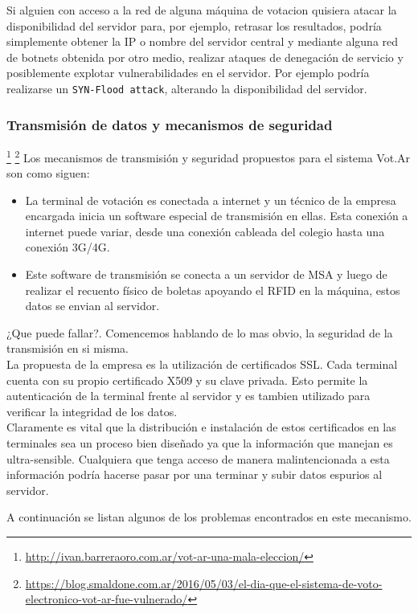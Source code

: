 Si alguien con acceso a la red de alguna máquina de votacion quisiera atacar la disponibilidad del servidor para, por ejemplo, retrasar los resultados, podría simplemente obtener la IP o nombre del servidor central y mediante alguna red de botnets obtenida por otro medio, realizar ataques de denegación de servicio y posiblemente explotar vulnerabilidades en el servidor. Por ejemplo podría realizarse un \texttt{SYN-Flood attack}, alterando la disponibilidad del servidor.


\subsubsection{Transmisión de datos y mecanismos de seguridad}
\footnote{\url{http://ivan.barreraoro.com.ar/vot-ar-una-mala-eleccion/}}
\footnote{\url{https://blog.smaldone.com.ar/2016/05/03/el-dia-que-el-sistema-de-voto-electronico-vot-ar-fue-vulnerado/}}
Los mecanismos de transmisión y seguridad propuestos para el sistema Vot.Ar son como siguen:
\begin{itemize}
	\item La terminal de votación es conectada a internet y un técnico de la empresa encargada inicia un software especial de transmisión en ellas. Esta conexión a internet puede variar, desde una conexión cableada del colegio hasta una conexión 3G/4G.
	\item Este software de transmisión se conecta a un servidor de MSA y luego de realizar el recuento físico de boletas apoyando el RFID en la máquina, estos datos se envian al servidor.
\end{itemize}

¿Que puede fallar?. Comencemos hablando de lo mas obvio, la seguridad de la transmisión en si misma.\\
La propuesta de la empresa es la utilización de certificados SSL. Cada terminal cuenta con su propio certificado X509 y su clave privada. Esto permite la autenticación de la terminal frente al servidor y es tambien utilizado para verificar la integridad de los datos.\\

Claramente es vital que la distribución e instalación de estos certificados en las terminales sea un proceso bien diseñado ya que la información que manejan es ultra-sensible. Cualquiera que tenga acceso de manera malintencionada a esta información podría hacerse pasar por una terminar y subir datos espurios al servidor.

A continuación se listan algunos de los problemas encontrados en este mecanismo.


